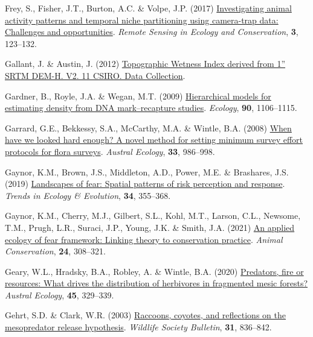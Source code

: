 \documentclass[11pt,a4paper,titlepage,twoside,openright]{style/unimelbthesis}
\newenvironment{CSLReferences}%
  {}%
  {\par}
\begin{document}
\begin{mainmatter}
\begin{CSLReferences}{1}{0}
\leavevmode{}%
Frey, S., Fisher, J.T., Burton, A.C. \& Volpe, J.P. (2017) \href{https://doi.org/10.1002/rse2.60}{Investigating animal activity patterns and temporal niche partitioning using camera-trap data: Challenges and opportunities}. \emph{Remote Sensing in Ecology and Conservation}, \textbf{3}, 123--132.

\leavevmode{}%
Gallant, J. \& Austin, J. (2012) \href{https://data.csiro.au/collection/csiro:5588}{{Topographic Wetness Index derived from 1'' SRTM DEM-H. V2. 11 CSIRO. Data Collection}}.

\leavevmode{}%
Gardner, B., Royle, J.A. \& Wegan, M.T. (2009) \href{https://doi.org/10.1890/07-2112.1}{Hierarchical models for estimating density from DNA mark--recapture studies}. \emph{Ecology}, \textbf{90}, 1106--1115.

\leavevmode{}%
Garrard, G.E., Bekkessy, S.A., McCarthy, M.A. \& Wintle, B.A. (2008) \href{https://doi.org/10.1111/j.1442-9993.2008.01869.x}{When have we looked hard enough? A novel method for setting minimum survey effort protocols for flora surveys}. \emph{Austral Ecology}, \textbf{33}, 986--998.

\leavevmode{}%
Gaynor, K.M., Brown, J.S., Middleton, A.D., Power, M.E. \& Brashares, J.S. (2019) \href{https://doi.org/10.1016/j.tree.2019.01.004}{Landscapes of fear: Spatial patterns of risk perception and response}. \emph{Trends in Ecology \& Evolution}, \textbf{34}, 355--368.

\leavevmode{}%
Gaynor, K.M., Cherry, M.J., Gilbert, S.L., Kohl, M.T., Larson, C.L., Newsome, T.M., Prugh, L.R., Suraci, J.P., Young, J.K. \& Smith, J.A. (2021) \href{https://doi.org/10.1111/acv.12629}{An applied ecology of fear framework: Linking theory to conservation practice}. \emph{Animal Conservation}, \textbf{24}, 308--321.

\leavevmode{}%
Geary, W.L., Hradsky, B.A., Robley, A. \& Wintle, B.A. (2020) \href{https://doi.org/10.1111/aec.12861}{Predators, fire or resources: What drives the distribution of herbivores in fragmented mesic forests?} \emph{Austral Ecology}, \textbf{45}, 329--339.

\leavevmode{}%
Gehrt, S.D. \& Clark, W.R. (2003) \href{https://www.jstor.org/stable/3784607}{Raccoons, coyotes, and reflections on the mesopredator release hypothesis}. \emph{Wildlife Society Bulletin}, \textbf{31}, 836--842.


\end{CSLReferences}
\end{mainmatter}
\end{document}
